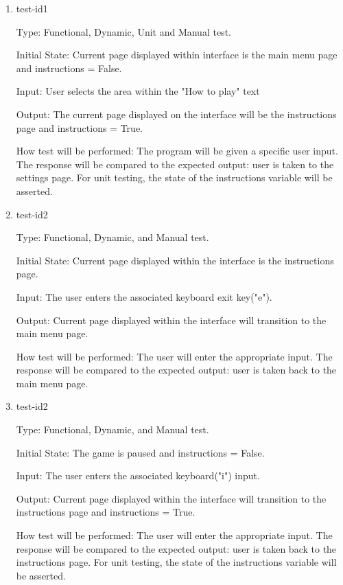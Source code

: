 \documentclass[12pt, titlepage]{article}
\begin{document}
\begin{enumerate}

\item{test-id1\\}

Type: Functional, Dynamic, Unit and Manual test.
					
Initial State: Current page displayed within interface is the main menu page and instructions = False.
					
Input: User selects the area within the "How to play" text
					
Output: The current page displayed on the interface will be the instructions page and instructions = True.
					
How test will be performed: The program will be given a specific user input. The response will be compared to the expected output: user is taken to the settings page. For unit testing, the state of the instructions variable will be asserted.


\item{test-id2\\}

Type: Functional, Dynamic, and Manual test.
					
Initial State: Current page displayed within the interface is the instructions page.
					
Input: The user enters the associated keyboard exit key("e").
					
Output: Current page displayed within the interface will transition to the main menu page.
					
How test will be performed: The user will enter the appropriate input. The response will be compared to the expected output: user is taken back to the main menu page.


\item{test-id2\\}

Type: Functional, Dynamic, and Manual test.
					
Initial State:  The game is paused and instructions = False.
					
Input: The user enters the associated keyboard("i") input.
					
Output: Current page displayed within the interface will transition to the instructions page and instructions = True.
					
How test will be performed: The user will enter the appropriate input. The response will be compared to the expected output: user is taken back to the instructions page. For unit testing, the state of the instructions variable will be asserted.



\end{enumerate}
\end{document}

